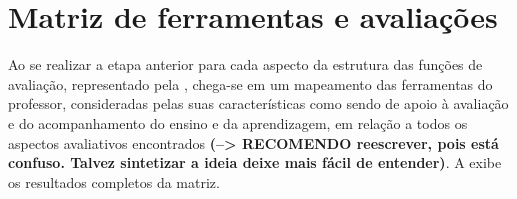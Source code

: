 
\section{Matriz de ferramentas e avaliações}%

Ao se realizar a etapa anterior para cada aspecto da estrutura das funções de avaliação, representado pela , chega-se em um mapeamento das ferramentas do professor, consideradas pelas suas características como sendo de apoio à avaliação e do acompanhamento do ensino e da aprendizagem, em relação a todos os aspectos avaliativos encontrados \textbf{(--> RECOMENDO reescrever, pois está confuso. Talvez sintetizar a ideia deixe mais fácil de entender)}. A  exibe os resultados completos da matriz.


